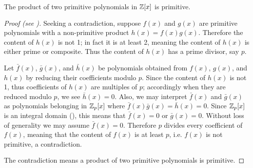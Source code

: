 \begin{lemma}[Gauss]\label{lemma-gauss-for-integer-coefficients}
    The product of two primitive polynomials in $\mathbb{Z}[x]$ is primitive.
\end{lemma}
\begin{proof}[Proof (see {\cite[p.~291]{gallian_2016}})]
    Seeking a contradiction, suppose $f(x)$ and $g(x)$ are primitive polynomials with a non-primitive product $h(x) = f(x)g(x)$. Therefore the content of $h(x)$ is not 1; in fact it is at least 2, meaning the content of $h(x)$ is either prime or composite. Thus the content of $h(x)$ has a prime divisor, say $p$.

    Let $\bar{f}(x)$, $\bar{g}(x)$, and $\bar{h}(x)$ be polynomials obtained from $f(x)$, $g(x)$, and $h(x)$ by reducing their coefficients modulo $p$. Since the content of $h(x)$ is not 1, thus coefficients of $h(x)$ are multiples of $p$; accordingly when they are reduced modulo $p$, we see $\bar{h}(x) = 0$. Also, we may interpret $\bar{f}(x)$ and $\bar{g}(x)$ as polynomials belonging in $\mathbb{Z}_p[x]$ where $\bar{f}(x)\bar{g}(x) = \bar{h}(x) = 0$. Since $\mathbb{Z}_p[x]$ is an integral domain (), this means that $\bar{f}(x) = 0$ or $\bar{g}(x) = 0$. Without loss of generality we may assume $\bar{f}(x) = 0$. Therefore $p$ divides every coefficient of $f(x)$, meaning that the content of $f(x)$ is at least $p$, i.e. $f(x)$ is not primitive, a contradiction.

    The contradiction means a product of two primitive polynomials is primitive.
\end{proof}

